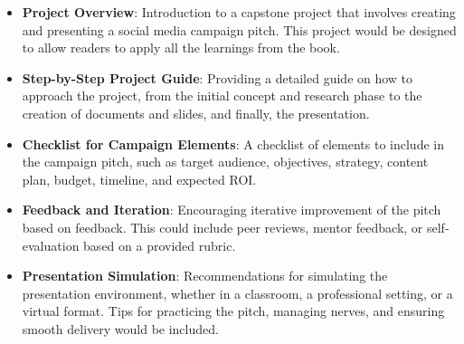 \documentclass[
]{book}
\providecommand{\tightlist}{%
  \setlength{\itemsep}{0pt}\setlength{\parskip}{0pt}}
\begin{document}
\begin{itemize}
\tightlist
\item
  \textbf{Project Overview}: Introduction to a capstone project that involves creating and presenting a social media campaign pitch. This project would be designed to allow readers to apply all the learnings from the book.
\item
  \textbf{Step-by-Step Project Guide}: Providing a detailed guide on how to approach the project, from the initial concept and research phase to the creation of documents and slides, and finally, the presentation.
\item
  \textbf{Checklist for Campaign Elements}: A checklist of elements to include in the campaign pitch, such as target audience, objectives, strategy, content plan, budget, timeline, and expected ROI.
\item
  \textbf{Feedback and Iteration}: Encouraging iterative improvement of the pitch based on feedback. This could include peer reviews, mentor feedback, or self-evaluation based on a provided rubric.
\item
  \textbf{Presentation Simulation}: Recommendations for simulating the presentation environment, whether in a classroom, a professional setting, or a virtual format. Tips for practicing the pitch, managing nerves, and ensuring smooth delivery would be included.
\end{itemize}

  
\end{document}
